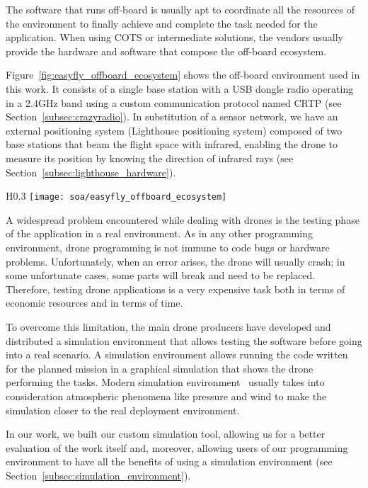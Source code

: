 The software that runs off-board is usually apt to coordinate all the resources of the environment to finally achieve and 
complete the task needed for the application. When using COTS or intermediate solutions, the vendors usually provide the 
hardware and software that compose the off-board ecosystem.

Figure~\ref{fig:easyfly_offboard_ecosystem} shows the off-board environment used in this work. 
It consists of a single base station with a USB dongle radio operating in a 2.4GHz band using a custom communication protocol named CRTP (see Section~\ref{subsec:crazyradio}). 
In substitution of a sensor network, we have an external positioning system (Lighthouse positioning system) composed of two base stations that beam the flight space with infrared, enabling the drone to measure its position by knowing the direction of infrared rays (see Section~\ref{subsec:lighthouse_hardware}).

\begin{wrapfigure}{H}{0.3\textwidth}
    \texttt{[image: soa/easyfly\_offboard\_ecosystem]}
    \caption{EasyFly off-board ecosystem.}\label{fig:easyfly_offboard_ecosystem}
\end{wrapfigure}

A widespread problem encountered while dealing with drones is the testing phase of the application in a real environment. 
As in any other programming environment, drone programming is not immune to code bugs or hardware problems. 
Unfortunately, when an error arises, the drone will usually crash; in some unfortunate cases, some parts will break and need to be replaced. 
Therefore, testing drone applications is a very expensive task both in terms of economic resources and in terms of time. 

To overcome this limitation, the main drone producers have developed and distributed a simulation environment that allows 
testing the software before going into a real scenario. 
A simulation environment allows running the code written for the planned mission in a graphical simulation that shows the drone performing the tasks. 
Modern simulation environment~\cite{sphinx, DIJflightSimulator} usually takes into consideration atmospheric phenomena like pressure and wind to make the simulation 
closer to the real deployment environment.

In our work, we built our custom simulation tool, allowing us for a better evaluation of the work itself and, moreover, allowing  
users of our programming environment to have all the benefits of using a simulation environment (see Section~\ref{subsec:simulation_environment}).


